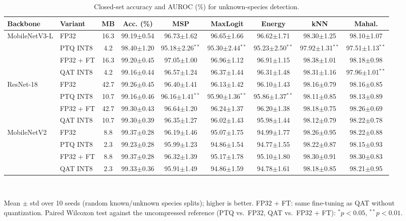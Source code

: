 \begin{table}[t]
\centering
\caption{Closed-set accuracy and AUROC (\%) for unknown-species detection.}
\label{tab:auroc}
\setlength{\tabcolsep}{3.5pt}
\footnotesize
\begin{tabular}{llccccccc}
\toprule
Backbone & Variant & MB & Acc. (\%) & MSP & MaxLogit & Energy & kNN & Mahal. \\
\midrule
MobileNetV3-L & FP32 & 16.3 & 99.19$\pm$0.54 & 96.73$\pm$1.62 & 96.65$\pm$1.66 & 96.62$\pm$1.71 & 98.30$\pm$1.25 & 98.10$\pm$1.07 \\
 & PTQ INT8 & 4.2 & 98.40$\pm$1.20 & 95.18$\pm$2.26$^{**}$ & 95.30$\pm$2.44$^{**}$ & 95.23$\pm$2.50$^{**}$ & 97.92$\pm$1.31$^{**}$ & 97.51$\pm$1.13$^{**}$ \\
 & FP32 + FT & 16.3 & 99.20$\pm$0.45 & 97.05$\pm$1.00 & 96.96$\pm$1.12 & 96.91$\pm$1.15 & 98.38$\pm$1.01 & 98.18$\pm$0.98 \\
 & QAT INT8 & 4.2 & 99.16$\pm$0.44 & 96.57$\pm$1.24 & 96.37$\pm$1.44 & 96.31$\pm$1.48 & 98.31$\pm$1.16 & 97.96$\pm$1.01$^{**}$ \\
\midrule
ResNet-18 & FP32 & 42.7 & 99.26$\pm$0.45 & 96.40$\pm$1.41 & 96.13$\pm$1.42 & 96.10$\pm$1.43 & 98.16$\pm$0.79 & 98.16$\pm$0.85 \\
 & PTQ INT8 & 10.7 & 99.16$\pm$0.46 & 96.16$\pm$1.41$^{**}$ & 95.90$\pm$1.36$^{**}$ & 95.86$\pm$1.37$^{**}$ & 98.11$\pm$0.85 & 98.13$\pm$0.89 \\
 & FP32 + FT & 42.7 & 99.30$\pm$0.43 & 96.64$\pm$1.20 & 96.24$\pm$1.37 & 96.20$\pm$1.38 & 98.18$\pm$0.75 & 98.26$\pm$0.69 \\
 & QAT INT8 & 10.7 & 99.30$\pm$0.39 & 96.35$\pm$1.27 & 96.02$\pm$1.43 & 95.98$\pm$1.44 & 98.12$\pm$0.79 & 98.22$\pm$0.78 \\
\midrule
MobileNetV2 & FP32 & 8.8 & 99.37$\pm$0.28 & 96.19$\pm$1.46 & 95.07$\pm$1.75 & 94.99$\pm$1.77 & 98.26$\pm$0.95 & 98.22$\pm$0.88 \\
 & PTQ INT8 & 2.3 & 99.23$\pm$0.28 & 95.99$\pm$1.23 & 94.86$\pm$1.54 & 94.77$\pm$1.55 & 98.22$\pm$0.87 & 98.15$\pm$0.93 \\
 & FP32 + FT & 8.8 & 99.37$\pm$0.28 & 96.32$\pm$1.39 & 95.17$\pm$1.78 & 95.10$\pm$1.80 & 98.30$\pm$0.91 & 98.30$\pm$0.83 \\
 & QAT INT8 & 2.3 & 99.33$\pm$0.36 & 95.91$\pm$1.49 & 94.86$\pm$1.59 & 94.78$\pm$1.61 & 98.18$\pm$0.85 & 98.21$\pm$0.95 \\
\bottomrule
\end{tabular}
\\[2pt]\parbox{\linewidth}{\scriptsize Mean $\pm$ std over 10 seeds (random known/unknown species splits); higher is better. FP32 + FT: same fine-tuning as QAT without quantization. Paired Wilcoxon test against the uncompressed reference (PTQ vs.\ FP32, QAT vs.\ FP32 + FT): $^{*}p<0.05$, $^{**}p<0.01$.}
\end{table}